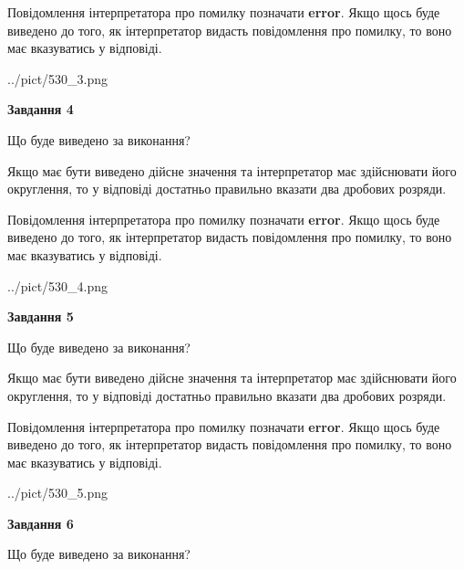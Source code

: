\documentclass[12pt, ukrainian]{article}
\begin{document}
{\begin {Large}
Повідомлення інтерпретатора про помилку позначати \textbf{error}.
Якщо щось буде виведено до того, як інтерпретатор видасть повідомлення про помилку, 
то воно має вказуватись у відповіді. \par

\begin{center}
	{../pict/530_3.png}
\end{center}
\newpage

{\begin {center}\textbf{Завдання 4}\end {center}}\par
Що буде виведено за виконання? \par

Якщо має бути виведено дійсне значення та інтерпретатор має здійснювати його округлення, 
то у відповіді достатньо правильно вказати два дробових розряди.

Повідомлення інтерпретатора про помилку позначати \textbf{error}.
Якщо щось буде виведено до того, як інтерпретатор видасть повідомлення про помилку, 
то воно має вказуватись у відповіді. \par

\begin{center}
	{../pict/530_4.png}
\end{center}
\newpage

{\begin {center}\textbf{Завдання 5}\end {center}}\par
Що буде виведено за виконання? \par

Якщо має бути виведено дійсне значення та інтерпретатор має здійснювати його округлення, 
то у відповіді достатньо правильно вказати два дробових розряди.

Повідомлення інтерпретатора про помилку позначати \textbf{error}.
Якщо щось буде виведено до того, як інтерпретатор видасть повідомлення про помилку, 
то воно має вказуватись у відповіді. \par

\begin{center}
	{../pict/530_5.png}
\end{center}
\newpage

{\begin {center}\textbf{Завдання 6}\end {center}}\par
Що буде виведено за виконання? \par


\end{Large}}
\end{document}
